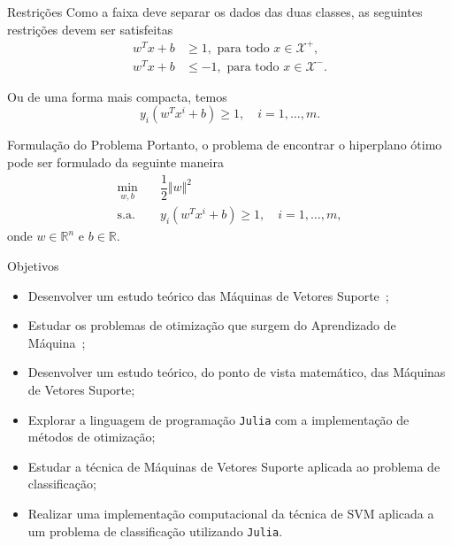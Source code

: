 \documentclass{beamer}
\def\Xset{\mathcal{X}}
\def\RR{\mathds{R}}
\theoremstyle{definition}%
\begin{document}
\begin{frame} 
\begin{block}{Restrições}
Como a faixa deve separar os dados das duas classes, as seguintes restrições devem ser satisfeitas
\begin{align}
w^{T}x+b &\geq 1 , \text{ para  todo } x\in \Xset^{+}, \\
w^{T}x+b &\leq -1 , \text{ para  todo } x\in \Xset^{-}.
\end{align}

Ou de uma forma mais compacta, temos
\[ y_{i}(w^{T}x^{i}+b)\geq 1, \quad i=1, \ldots ,m. \]
\end{block}
\end{frame}


\begin{frame}
\begin{block}{Formulação do Problema}
Portanto, o problema de encontrar o hiperplano ótimo pode ser formulado da seguinte maneira
\[ \label{eq5}
\begin{aligned}
\min_{w,b} & \quad \dfrac{1}{2} \Vert w\Vert^{2} \\
\text{s.a.} &  \quad y_i(w^{T}x^{i}+b) \geq 1, \quad i=1, \ldots , m, \end{aligned}
\]
onde $w\in \RR^{n}$ e $b\in \RR$. 
\end{block}
\end{frame}


\begin{frame}{Objetivos}
\begin{itemize}
	\item Desenvolver um estudo teórico das Máquinas de Vetores Suporte~\cite{Faisal2019,Evelin2017};

	\item Estudar os problemas de otimização que surgem do Aprendizado de Máquina~\cite{Ana1994,Ademir2013};

	\item Desenvolver um estudo teórico, do ponto de vista matemático, das Máquinas de Vetores Suporte;

	\item Explorar a linguagem de programação \texttt{Julia} com a implementação de métodos de otimização;

	\item Estudar a técnica de Máquinas de Vetores Suporte aplicada ao problema de classificação; 

	\item Realizar uma implementação computacional da técnica de SVM aplicada a um problema de classificação utilizando \texttt{Julia}.
\end{itemize}
\end{frame}
\end{document}

